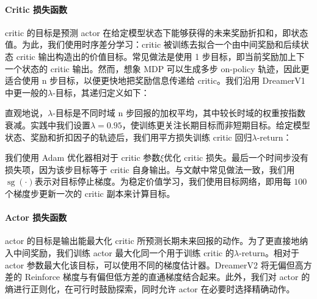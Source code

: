 \paragraph{Critic 损失函数}

critic 的目标是预测 actor 在给定模型状态下能够获得的未来奖励折扣和，即状态值。为此，我们使用时序差分学习：critic 被训练去拟合一个由中间奖励和后续状态 critic 输出构造出的价值目标。常见做法是使用 1 步目标，即当前奖励加上下一个状态的 critic 输出。然而，想象 MDP 可以生成多步 on-policy 轨迹，因此更适合使用 n 步目标，以便更快地把奖励信息传递给 critic。我们沿用 DreamerV1 中更一般的$\lambda$-目标\citep{sutton2018rlbook,schulman2015gae}，其递归定义如下：


直观地说，$\lambda$-目标是不同时域 n 步回报的加权平均，其中较长时域的权重按指数衰减。实践中我们设置$\lambda=0.95$，使训练更关注长期目标而非短期目标。给定模型状态、奖励和折扣因子的轨迹后，我们用平方损失训练 critic 回归$\lambda$-return：


我们使用 Adam 优化器相对于 critic 参数$\xi$优化 critic 损失。最后一个时间步没有损失项，因为该步目标等于 critic 自身输出。与文献中常见做法一致，我们用$\operatorname{sg}(\cdot)$表示对目标停止梯度。为稳定价值学习，我们使用目标网络\citep{mnih2015dqn}，即用每 $100$ 个梯度步更新一次的 critic 副本来计算目标。

\paragraph{Actor 损失函数}

actor 的目标是输出能最大化 critic 所预测长期未来回报的动作。为了更直接地纳入中间奖励，我们训练 actor 最大化同一个用于训练 critic 的$\lambda$-return。相对于 actor 参数最大化该目标，可以使用不同的梯度估计器。DreamerV2 将无偏但高方差的 Reinforce 梯度与有偏但低方差的直通梯度结合起来。此外，我们对 actor 的熵进行正则化，在可行时鼓励探索，同时允许 actor 在必要时选择精确动作。

